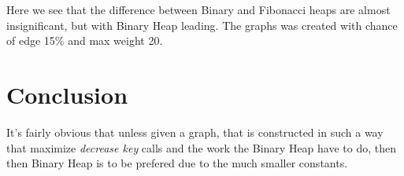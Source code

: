 Here we see that the difference between Binary and Fibonacci heaps are almost insignificant, but with Binary Heap leading. The graphs was created with chance of edge 15\% and max weight 20.
\section*{Conclusion}
It's fairly obvious that unless given a graph, that is constructed in such a way that maximize \textit{decrease key} calls and the work the Binary Heap have to do, then then Binary Heap is to be prefered due to the much smaller constants.